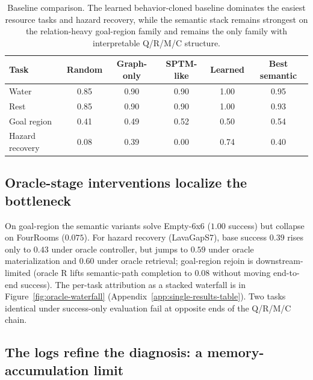 \documentclass{article}
\begin{document}
\begin{table}[t]
  \caption{Baseline comparison. The learned behavior-cloned baseline dominates the easiest resource tasks and hazard recovery, while the semantic stack remains strongest on the relation-heavy goal-region family and remains the only family with interpretable Q/R/M/C structure.}
  \label{tab:baselines}
  \centering
  \small
  \begin{tabular}{p{1.9cm}c c c c c}
    \toprule
    Task & Random & Graph-only & SPTM-like & Learned & Best semantic \\
    \midrule
    Water & 0.85 & 0.90 & 0.90 & 1.00 & 0.95 \\
    Rest & 0.85 & 0.90 & 0.90 & 1.00 & 0.93 \\
    Goal region & 0.41 & 0.49 & 0.52 & 0.50 & 0.54 \\
    Hazard recovery & 0.08 & 0.39 & 0.00 & 0.74 & 0.40 \\
    \bottomrule
  \end{tabular}
\end{table}

\subsection{Oracle-stage interventions localize the bottleneck}
\label{sec:oracle}

On goal-region the semantic variants solve Empty-6x6 ($1.00$ success) but collapse on FourRooms ($0.075$). For hazard recovery (LavaGapS7), base success $0.39$ rises only to $0.43$ under oracle controller, but jumps to $0.59$ under oracle materialization and $0.60$ under oracle retrieval; goal-region rejoin is downstream-limited (oracle R lifts semantic-path completion to $0.08$ without moving end-to-end success). The per-task attribution as a stacked waterfall is in Figure~\ref{fig:oracle-waterfall} (Appendix~\ref{app:single-results-table}). Two tasks identical under success-only evaluation fail at opposite ends of the Q/R/M/C chain.

\subsection{The logs refine the diagnosis: a memory-accumulation limit}
\label{sec:refined-attribution}
\end{document}
